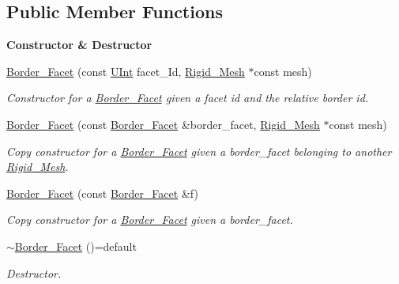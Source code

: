 \subsection*{Public Member Functions}
\begin{Indent}{\bf Constructor \& Destructor}\par
\begin{DoxyCompactItemize}
\item 
\hyperlink{classFVCode3D_1_1Rigid__Mesh_1_1Border__Facet_a0743c20fab3de8ce77c2143b14c3bfae}{Border\+\_\+\+Facet} (const \hyperlink{namespaceFVCode3D_a4bf7e328c75d0fd504050d040ebe9eda}{U\+Int} facet\+\_\+\+Id, \hyperlink{classFVCode3D_1_1Rigid__Mesh}{Rigid\+\_\+\+Mesh} $\ast$const mesh)
\begin{DoxyCompactList}\small\item\em Constructor for a \hyperlink{classFVCode3D_1_1Rigid__Mesh_1_1Border__Facet}{Border\+\_\+\+Facet} given a facet id and the relative border id. \end{DoxyCompactList}\item 
\hyperlink{classFVCode3D_1_1Rigid__Mesh_1_1Border__Facet_ab50bc3e2dc770cb7490c85e548662996}{Border\+\_\+\+Facet} (const \hyperlink{classFVCode3D_1_1Rigid__Mesh_1_1Border__Facet}{Border\+\_\+\+Facet} \&border\+\_\+facet, \hyperlink{classFVCode3D_1_1Rigid__Mesh}{Rigid\+\_\+\+Mesh} $\ast$const mesh)
\begin{DoxyCompactList}\small\item\em Copy constructor for a \hyperlink{classFVCode3D_1_1Rigid__Mesh_1_1Border__Facet}{Border\+\_\+\+Facet} given a border\+\_\+facet belonging to another \hyperlink{classFVCode3D_1_1Rigid__Mesh}{Rigid\+\_\+\+Mesh}. \end{DoxyCompactList}\item 
\hyperlink{classFVCode3D_1_1Rigid__Mesh_1_1Border__Facet_a55edda2483a7ba68ab73c1b920c0b553}{Border\+\_\+\+Facet} (const \hyperlink{classFVCode3D_1_1Rigid__Mesh_1_1Border__Facet}{Border\+\_\+\+Facet} \&f)
\begin{DoxyCompactList}\small\item\em Copy constructor for a \hyperlink{classFVCode3D_1_1Rigid__Mesh_1_1Border__Facet}{Border\+\_\+\+Facet} given a border\+\_\+facet. \end{DoxyCompactList}\item 
\hyperlink{classFVCode3D_1_1Rigid__Mesh_1_1Border__Facet_ac41f80e450cfae81f23228b9edf6c40a}{$\sim$\+Border\+\_\+\+Facet} ()=default
\begin{DoxyCompactList}\small\item\em Destructor. \end{DoxyCompactList}\end{DoxyCompactItemize}
\end{Indent}
